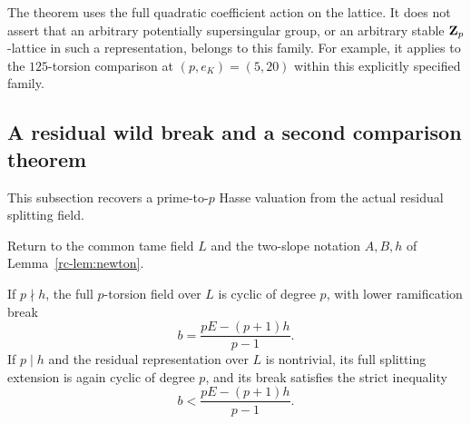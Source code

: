 \begin{remark}
The theorem uses the full quadratic coefficient action on the lattice.
It does not assert that an arbitrary potentially supersingular group, or an
arbitrary stable $\mathbf Z_p$-lattice in such a representation, belongs to this
family. For example, it applies to the $125$-torsion comparison at
$(p,e_K)=(5,20)$ within this explicitly specified family.
\end{remark}

\subsection{A residual wild break and a second comparison theorem}\label{rc-sec:residual}
This subsection recovers a prime-to-$p$ Hasse valuation from the actual residual splitting field.


Return to the common tame field $L$ and the two-slope notation $A,B,h$
of Lemma~\ref{rc-lem:newton}.

\begin{proposition}\label{rc-prop:break}
If $p\nmid h$, the full $p$-torsion field over $L$ is cyclic of degree $p$,
with lower ramification break
\begin{equation}\label{rc-eq:break}
 b=\frac{pE-(p+1)h}{p-1}.
\end{equation}
If $p\mid h$ and the residual representation over $L$ is nontrivial, its
full splitting extension is again cyclic of degree $p$, and its break
satisfies the strict inequality
\[
 b<\frac{pE-(p+1)h}{p-1}.
\]
\end{proposition}

